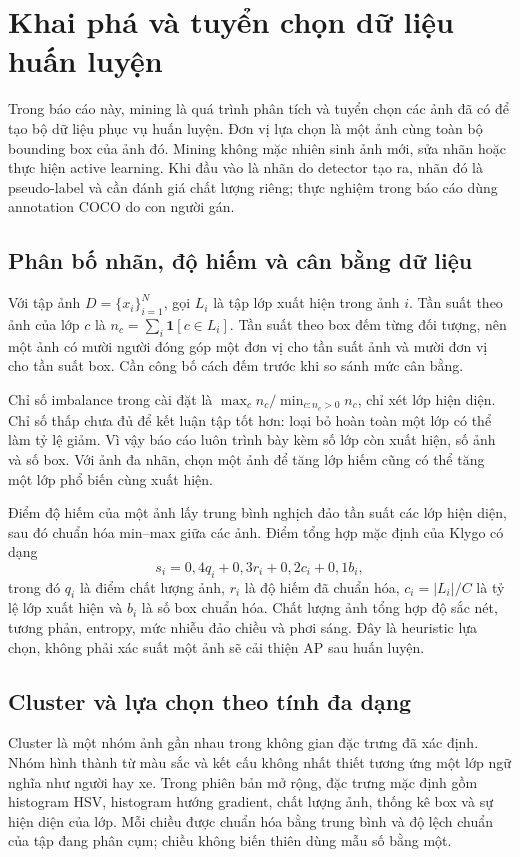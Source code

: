 \section{Khai phá và tuyển chọn dữ liệu huấn luyện}
Trong báo cáo này, mining là quá trình phân tích và tuyển chọn các ảnh đã có để tạo bộ dữ liệu phục vụ huấn luyện. Đơn vị lựa chọn là một ảnh cùng toàn bộ bounding box của ảnh đó. Mining không mặc nhiên sinh ảnh mới, sửa nhãn hoặc thực hiện active learning. Khi đầu vào là nhãn do detector tạo ra, nhãn đó là pseudo-label và cần đánh giá chất lượng riêng; thực nghiệm trong báo cáo dùng annotation COCO do con người gán.

\subsection{Phân bố nhãn, độ hiếm và cân bằng dữ liệu}
Với tập ảnh $D=\{x_i\}_{i=1}^{N}$, gọi $L_i$ là tập lớp xuất hiện trong ảnh $i$. Tần suất theo ảnh của lớp $c$ là $n_c=\sum_i\mathbf{1}[c\in L_i]$. Tần suất theo box đếm từng đối tượng, nên một ảnh có mười người đóng góp một đơn vị cho tần suất ảnh và mười đơn vị cho tần suất box. Cần công bố cách đếm trước khi so sánh mức cân bằng.

Chỉ số imbalance trong cài đặt là $\max_c n_c/\min_{c:n_c>0}n_c$, chỉ xét lớp hiện diện. Chỉ số thấp chưa đủ để kết luận tập tốt hơn: loại bỏ hoàn toàn một lớp có thể làm tỷ lệ giảm. Vì vậy báo cáo luôn trình bày kèm số lớp còn xuất hiện, số ảnh và số box. Với ảnh đa nhãn, chọn một ảnh để tăng lớp hiếm cũng có thể tăng một lớp phổ biến cùng xuất hiện.

Điểm độ hiếm của một ảnh lấy trung bình nghịch đảo tần suất các lớp hiện diện, sau đó chuẩn hóa min--max giữa các ảnh. Điểm tổng hợp mặc định của Klygo có dạng
\begin{equation}
 s_i=0{,}4q_i+0{,}3r_i+0{,}2c_i+0{,}1b_i,
\end{equation}
trong đó $q_i$ là điểm chất lượng ảnh, $r_i$ là độ hiếm đã chuẩn hóa, $c_i=|L_i|/C$ là tỷ lệ lớp xuất hiện và $b_i$ là số box chuẩn hóa. Chất lượng ảnh tổng hợp độ sắc nét, tương phản, entropy, mức nhiễu đảo chiều và phơi sáng. Đây là heuristic lựa chọn, không phải xác suất một ảnh sẽ cải thiện AP sau huấn luyện.

\subsection{Cluster và lựa chọn theo tính đa dạng}
Cluster là một nhóm ảnh gần nhau trong không gian đặc trưng đã xác định. Nhóm hình thành từ màu sắc và kết cấu không nhất thiết tương ứng một lớp ngữ nghĩa như người hay xe. Trong phiên bản mở rộng, đặc trưng mặc định gồm histogram HSV, histogram hướng gradient, chất lượng ảnh, thống kê box và sự hiện diện của lớp. Mỗi chiều được chuẩn hóa bằng trung bình và độ lệch chuẩn của tập đang phân cụm; chiều không biến thiên dùng mẫu số bằng một.

